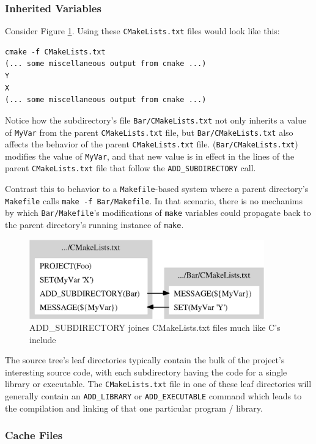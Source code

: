 \documentclass[letterpaper,10pt]{article}
\begin{document}
\subsubsection{Inherited Variables}
Consider Figure \ref{fig:cmake-file-structure}.  Using these 
\verb|CMakeLists.txt| files would look like this:
\begin{verbatim}
cmake -f CMakeLists.txt
(... some miscellaneous output from cmake ...)
Y
X
(... some miscellaneous output from cmake ...)
\end{verbatim} 

Notice how the subdirectory's file \verb|Bar/CMakeLists.txt| not 
only inherits a value of \verb|MyVar| from the parent \verb|CMakeLists.txt| 
file, but \verb|Bar/CMakeLists.txt| also affects the behavior of the
parent \verb|CMakeLists.txt| file.  (\verb|Bar/CMakeLists.txt|) modifies
the value of \verb|MyVar|, and that new value is in effect in the 
lines of the parent \verb|CMakeLists.txt| file that follow the 
\verb|ADD_SUBDIRECTORY| call.  

Contrast this to behavior to a \verb|Makefile|-based system where 
a parent directory's \verb|Makefile| calls \verb|make -f Bar/Makefile|.
In that scenario, there is no mechanims by which \verb|Bar/Makefile|'s
modifications of \verb|make| variables could propagate back to the 
parent directory's running instance of \verb|make|.

\begin{figure}
 \centering
\includegraphics[width=4in]{file-structure.eps}
   \caption{ADD\_SUBDIRECTORY joines CMakeLists.txt files much like C's include}
   \label{fig:cmake-file-structure}
\end{figure}


The source tree's leaf directories typically contain the bulk of the project's 
interesting source code, with each subdirectory having the code for a single
library or executable.  The \verb|CMakeLists.txt| file in one of these leaf
directories will generally contain an \verb|ADD_LIBRARY| or \verb|ADD_EXECUTABLE|
command which leads to the compilation and linking of that one particular
program / library.

\subsubsection{Cache Files}
\end{document}
